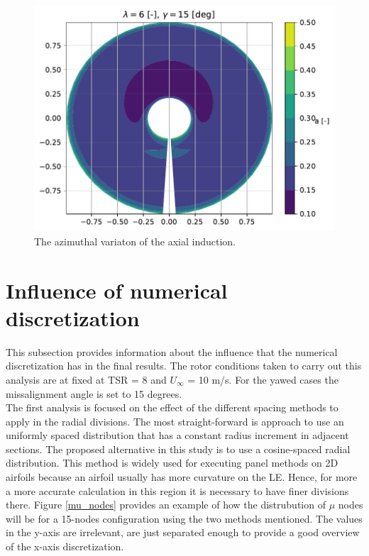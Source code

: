 \begin{figure}[htbp]
	\centering
	\includegraphics[height=0.45\textheight]{./img/yaw/contour-n_az-51.pdf}
	\caption{The azimuthal variaton of the axial induction.}
	\label{img:contour}
\end{figure}



\section{Influence of numerical discretization}

This subsection provides information about the influence that the numerical discretization has in the final results. The rotor conditions taken to carry out this analysis are at fixed at TSR = 8 and $U_{\infty} $ = 10 m/s. For the yawed cases the missalignment angle is set to 15 degrees. \\

The first analysis is focused on the effect of the different spacing methods to apply in the radial divisions. The most straight-forward is approach to use an uniformly spaced distribution that has a constant radius increment in adjacent sections. The proposed alternative in this study is to use a cosine-spaced radial distribution. This method is widely used for executing panel methods on 2D airfoils because an airfoil usually has more curvature on the LE. Hence, for more a more accurate calculation in this region it is necessary to have finer divisions there. Figure \ref{mu_nodes} provides an example of how the distrubution of $\mu$ nodes will be for a 15-nodes configuration using the two methods mentioned. The values in the y-axis are irrelevant, are just separated enough to provide a good overview of the x-axis discretization. 

